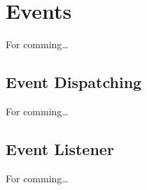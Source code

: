 \section{Events}
For comming\ldots


	\subsection{Event Dispatching}
		For comming\ldots
	
	
	\subsection{Event Listener}
		For comming\ldots

